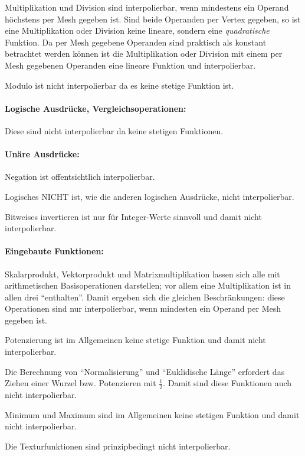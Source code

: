 \documentclass[twoside,a4paper,fleqn,12pt]{article}
\begin{document}
Multiplikation und Division sind interpolierbar, wenn mindestens ein Operand höchstens per Mesh gegeben ist.
Sind beide Operanden per Vertex gegeben, so ist eine Multiplikation oder Division keine lineare,
sondern eine \emph{quadratische} Funktion. Da per Mesh gegebene Operanden sind praktisch als
konstant betrachtet werden können ist die Multiplikation oder Division mit einem per Mesh gegebenen
Operanden eine lineare Funktion und interpolierbar.

Modulo ist nicht interpolierbar da es keine stetige Funktion ist.

\paragraph{Logische Ausdrücke, Vergleichsoperationen:} Diese sind nicht interpolierbar da keine stetigen Funktionen.

\paragraph{Unäre Ausdrücke:} Negation ist offentsichtlich interpolierbar.

Logisches NICHT ist, wie die anderen logischen Ausdrücke, nicht interpolierbar.

Bitweises invertieren ist nur für Integer-Werte sinnvoll und damit nicht interpolierbar.

\paragraph{Eingebaute Funktionen:} \label{split_builtins}
Skalarprodukt, Vektorprodukt und Matrixmultiplikation lassen sich alle mit arithmetischen Basisoperationen darstellen;
vor allem eine Multiplikation ist in allen drei "`enthalten"'. Damit ergeben sich die gleichen Beschränkungen:
diese Operationen sind nur interpolierbar, wenn mindesten ein Operand per Mesh gegeben ist.

Potenzierung ist im Allgemeinen keine stetige Funktion und damit nicht interpolierbar.

Die Berechnung von "`Normalisierung"' und "`Euklidische Länge"' erfordert das Ziehen einer Wurzel bzw. Potenzieren mit $\frac{1}{2}$.
Damit sind diese Funktionen auch nicht interpolierbar.

Minimum und Maximum sind im Allgemeinen keine stetigen Funktion und damit nicht interpolierbar.

Die Texturfunktionen sind prinzipbedingt nicht interpolierbar.
\end{document}
